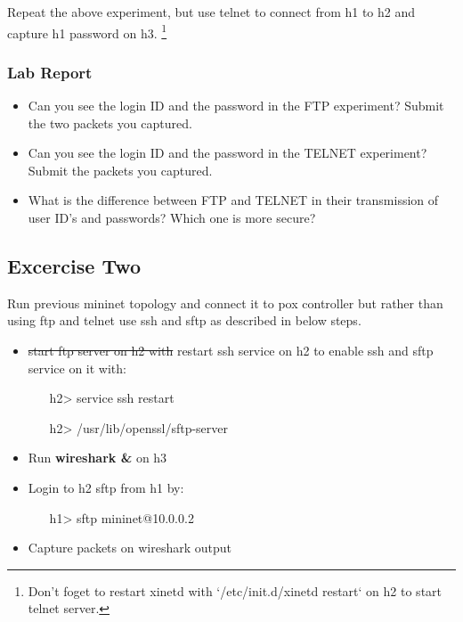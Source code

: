 \documentclass[10pt,a4paper]{article}
\numberwithin{equation}{section}
\numberwithin{figure}{section}
\numberwithin{table}{section}
\begin{document}
Repeat the above experiment, but use telnet to connect from h1 to h2 and capture h1 password on h3. \footnote{Don't foget to restart xinetd with `/etc/init.d/xinetd restart` on h2 to start telnet server. }

\subsubsection*{ Lab Report}
\begin{itemize}
	\setlength{\itemindent}{0pt}
	\item Can you see the login ID and the password in the FTP experiment? Submit the two packets you captured.
	\item Can you see the login ID and the password in the TELNET experiment? Submit the packets you captured.
	\item What is the difference between FTP and TELNET in their transmission of user ID’s and passwords? Which one is more secure?
\end{itemize}

\subsection{Excercise Two}
Run previous mininet topology and connect it to pox controller but rather than using ftp and telnet use ssh and sftp as described in below steps.

\begin{itemize}
	\setlength{\itemindent}{10pt}
	\item \sout{start ftp server on h2 with}  restart ssh service on h2 to enable ssh and sftp service on it with:
	\begin{enumerate}
		\setlength{\itemindent}{10pt}
		\item [h2>] service ssh restart
		\item [h2>] /usr/lib/openssl/sftp-server
	\end{enumerate}
	\item Run \textbf{wireshark \&} on h3
	\item Login to h2 sftp from h1 by:
	\begin{enumerate}
		\setlength{\itemindent}{10pt}
		\item [h1>] sftp mininet@10.0.0.2
	\end{enumerate}
	\item Capture packets on wireshark output
	
\end{itemize}
\end{document}

